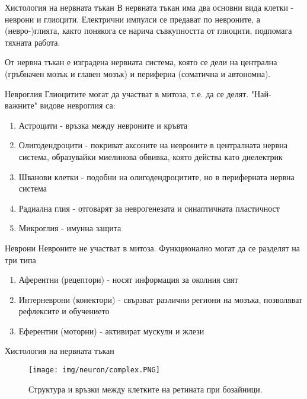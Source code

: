 \begin{frame}[t]{Хистология на нервната тъкан}
    В нервната тъкан има два основни вида клетки - неврони и глиоцити.
    Електрични импулси се предават по невроните, а (невро-)глията, 
    както понякога се нарича съвкупността от глиоцити, подпомага тяхната работа.

    От нервна тъкан е изградена нервната система, която се дели на централна (гръбначен мозък и главен мозък) и периферна (соматична и автономна).
\end{frame}

\begin{frame}[t]{Невроглия}
    Глиоцитите могат да участват в митоза, т.е. да се делят. "Най-важните" видове невроглия са:
    \begin{enumerate}
        \item Астроцити - връзка между невроните и кръвта
        \item Олигодендроцити - покриват аксоните на невроните в централната нервна система, образувайки миелинова обвивка, която действа като диелектрик
        \item Шванови клетки - подобни на олигодендроцитите, но в периферната нервна система
        \item Радиална глия - отговарят за неврогенезата и синаптичната пластичност
        \item Микроглия - имунна защита
    \end{enumerate}
\end{frame}

\begin{frame}[t]{Неврони}
    Невроните не участват в митоза. Функционално могат да се разделят на три типа
    \begin{enumerate}
        \item Аферентни (рецептори) - носят информация за околния свят 
        \item Интерневрони (конектори) - свързват различни региони на мозъка, позволяват рефлексите и обучението 
        \item Еферентни (моторни) - активират мускули и жлези
    \end{enumerate}
\end{frame}

\begin{frame}[t]{Хистология на нервната тъкан}
    \begin{figure}[htbp!]
      \centering
      \texttt{[image: img/neuron/complex.PNG]}
      \caption{Структура и връзки между клетките на ретината при бозайници. \cite[Фиг 1.2]{Neuron}}
    \end{figure}
\end{frame}

